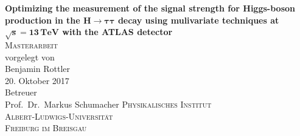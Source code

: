 \begin{titlepage}
\begin{center}
    {\huge \textbf{Optimizing the measurement of the signal strength for Higgs-boson production in the $\bm{H \to \tau\tau}$ decay using mulivariate techniques at $\bm{\sqrt{s} = 13\,\text{TeV}}$ with the ATLAS detector}}\\[2cm]

	\textsc{\LARGE Masterarbeit}\\[2cm]

    {\large vorgelegt von}\\[0.5cm]
    {\Large Benjamin Rottler} \\[0.5cm]
    {\large 20. Oktober 2017} \\[2cm]

    {\large Betreuer}\\[0.5cm]
    {\Large Prof.\ Dr.\ Markus Schumacher}
  	\vfill
	\large
	\textsc{Physikalisches Institut} \\
	\textsc{Albert-Ludwigs-Universität} \\
	\textsc{Freiburg im Breisgau} \\[1cm]
\end{center}
\end{titlepage}
